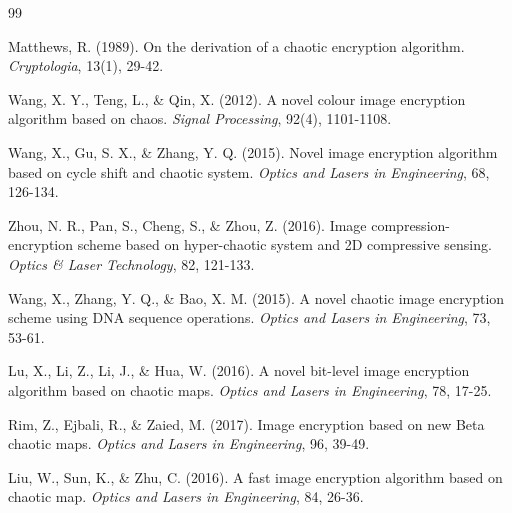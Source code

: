 \begin{thebibliography}{99}
\begin{LTRbibitems}
 Matthews, R. (1989). On the derivation of a chaotic encryption algorithm. \textit{Cryptologia}, 13(1), 29-42.
\end{LTRbibitems}

\begin{LTRbibitems}
 Wang, X. Y., Teng, L., \& Qin, X. (2012). A novel colour image encryption algorithm based on chaos. \textit{Signal Processing}, 92(4), 1101-1108.
\end{LTRbibitems}

\begin{LTRbibitems}
 Wang, X., Gu, S. X., \& Zhang, Y. Q. (2015). Novel image encryption algorithm based on cycle shift and chaotic system. \textit{Optics and Lasers in Engineering}, 68, 126-134.
\end{LTRbibitems}

\begin{LTRbibitems}
 Zhou, N. R., Pan, S., Cheng, S., \& Zhou, Z. (2016). Image compression-encryption scheme based on hyper-chaotic system and 2D compressive sensing. \textit{Optics \& Laser Technology}, 82, 121-133.
\end{LTRbibitems}

\begin{LTRbibitems}
 Wang, X., Zhang, Y. Q., \& Bao, X. M. (2015). A novel chaotic image encryption scheme using DNA sequence operations. \textit{Optics and Lasers in Engineering}, 73, 53-61.
\end{LTRbibitems}

\begin{LTRbibitems}
 Lu, X., Li, Z., Li, J., \& Hua, W. (2016). A novel bit-level image encryption algorithm based on chaotic maps. \textit{Optics and Lasers in Engineering}, 78, 17-25.
\end{LTRbibitems}

\begin{LTRbibitems}
 Rim, Z., Ejbali, R., \& Zaied, M. (2017). Image encryption based on new Beta chaotic maps. \textit{Optics and Lasers in Engineering}, 96, 39-49.
\end{LTRbibitems}

\begin{LTRbibitems}
 Liu, W., Sun, K., \& Zhu, C. (2016). A fast image encryption algorithm based on chaotic map. \textit{Optics and Lasers in Engineering}, 84, 26-36.
\end{LTRbibitems}


\end{thebibliography}
